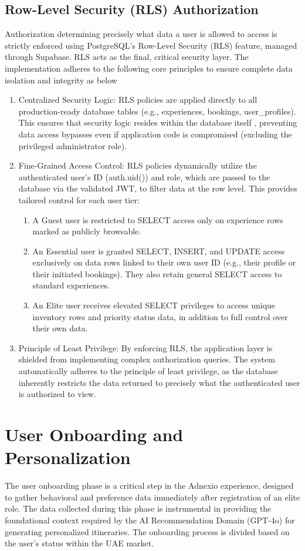 \subsection{Row-Level Security (RLS) Authorization}
\label{subsection:Row-Level Security (RLS) Authorization}
Authorization determining precisely what data a user is allowed to access is strictly enforced using PostgreSQL’s Row-Level Security (RLS) feature, managed through Supabase. RLS acts as the final, critical security layer.  The implementation adheres to the following core principles to ensure complete data isolation and integrity as below
\begin{enumerate}
    \item Centralized Security Logic: RLS policies are applied directly to all production-ready database tables (e.g., experiences, bookings, user\_profiles). This ensures that security logic resides within the database itself , preventing data access bypasses even if application code is compromised (excluding the privileged administrator role).
    \item Fine-Grained Access Control: RLS policies dynamically utilize the authenticated user's ID (auth.uid()) and role, which are passed to the database via the validated JWT, to filter data at the row level. This provides tailored control for each user tier:
    \begin{enumerate}
        \item A Guest user is restricted to SELECT access only on experience rows marked as publicly browsable.
        \item An Essential user is granted SELECT, INSERT, and UPDATE access exclusively on data rows linked to their own user ID (e.g., their profile or their initiated bookings). They also retain general SELECT access to standard experiences.
        \item An Elite user receives elevated SELECT privileges to access unique inventory rows and priority status data, in addition to full control over their own data.
    \end{enumerate}
    \item Principle of Least Privilege: By enforcing RLS, the application layer is shielded from implementing complex authorization queries. The system automatically adheres to the principle of least privilege, as the database inherently restricts the data returned to precisely what the authenticated user is authorized to view.
\end{enumerate}
\section{User Onboarding and Personalization}
The user onboarding phase is a critical step in the Adnexio experience, designed to gather behavioral and preference data immediately after registration of an elite role. The data collected during this phase is instrumental in providing the foundational context required by the AI Recommendation Domain (GPT-4o) for generating personalized itineraries. The onboarding process is divided based on the user's status within the UAE market.

